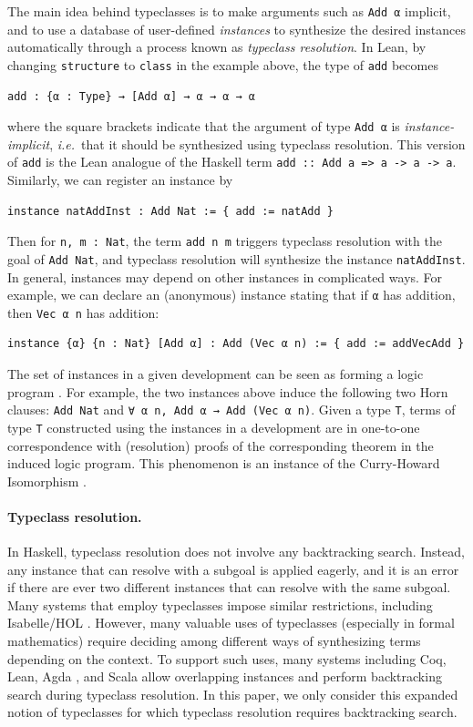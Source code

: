 \documentclass[runningheads]{llncs}
\newcommand\ie{\emph{i.e.}\ }
\newcommand{\icode}[1]{\texttt{\small #1}}
\begin{document}
The main idea behind typeclasses is to make arguments such as \lstinline{Add α} implicit,
and to use a database of user-defined \emph{instances}
to synthesize the desired instances automatically through a process known as
\emph{typeclass resolution}.
In Lean, by changing \lstinline{structure} to \lstinline{class} in the example above, the type
of \lstinline{add} becomes
\begin{lstlisting}
add : {α : Type} → [Add α] → α → α → α
\end{lstlisting} where the square brackets indicate that the argument
of type \lstinline{Add α} is \emph{instance-implicit}, \ie that it should be synthesized
using typeclass resolution. This version of \lstinline{add} is the Lean analogue of the Haskell term \icode{add :: Add a => a -> a -> a}.
Similarly, we can register an instance by
\begin{lstlisting}
instance natAddInst : Add Nat := { add := natAdd }
\end{lstlisting}
Then for \lstinline{n, m : Nat}, the term \lstinline|add n m| triggers typeclass resolution
with the goal of \lstinline{Add Nat}, and typeclass resolution will synthesize the instance
\lstinline{natAddInst}.
In general, instances may depend on other instances in complicated ways.
For example, we can declare an (anonymous) instance stating that if \lstinline{α} has addition,
then \lstinline{Vec α n} has addition:
\begin{lstlisting}
instance {α} {n : Nat} [Add α] : Add (Vec α n) := { add := addVecAdd }
\end{lstlisting}
The set of instances in a given development can be seen as forming a logic program \cite{robinson1965machine}. For example, the two instances above induce the following two Horn clauses:
\lstinline{Add Nat} and \lstinline{∀ α n, Add α → Add (Vec α n)}.
Given a type \lstinline{T}, terms of type \lstinline{T} constructed using the instances in a development
are in one-to-one correspondence with (resolution) proofs of the corresponding theorem in the induced logic program.
This phenomenon is an instance of the Curry-Howard Isomorphism \cite{curry1934functionality,howard1980formulae}.

\paragraph{Typeclass resolution.}

In Haskell, typeclass resolution does not involve any backtracking search.
Instead, any instance that can resolve with a subgoal is applied eagerly, and
it is an error if there are ever two different instances that can resolve with the same subgoal.
Many systems that employ typeclasses impose similar restrictions, including Isabelle/HOL \cite{nipkow2002isabelle}.
However, many valuable uses of typeclasses (especially in formal mathematics) require deciding among
different ways of synthesizing terms depending on the context.
To support such uses, many systems including Coq, Lean, Agda \cite{bove2009brief}, and Scala \cite{odersky2004overview}
allow overlapping instances and perform backtracking search during typeclass resolution.
In this paper, we only consider this expanded notion of typeclasses for which typeclass resolution requires backtracking search.
\end{document}
